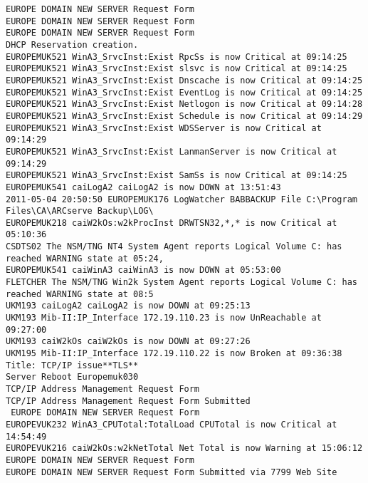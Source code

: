 \begin{lstlisting}
EUROPE DOMAIN NEW SERVER Request Form
EUROPE DOMAIN NEW SERVER Request Form
EUROPE DOMAIN NEW SERVER Request Form
DHCP Reservation creation.
EUROPEMUK521 WinA3_SrvcInst:Exist RpcSs is now Critical at 09:14:25
EUROPEMUK521 WinA3_SrvcInst:Exist slsvc is now Critical at 09:14:25
EUROPEMUK521 WinA3_SrvcInst:Exist Dnscache is now Critical at 09:14:25
EUROPEMUK521 WinA3_SrvcInst:Exist EventLog is now Critical at 09:14:25
EUROPEMUK521 WinA3_SrvcInst:Exist Netlogon is now Critical at 09:14:28
EUROPEMUK521 WinA3_SrvcInst:Exist Schedule is now Critical at 09:14:29
EUROPEMUK521 WinA3_SrvcInst:Exist WDSServer is now Critical at 09:14:29
EUROPEMUK521 WinA3_SrvcInst:Exist LanmanServer is now Critical at 09:14:29
EUROPEMUK521 WinA3_SrvcInst:Exist SamSs is now Critical at 09:14:25
EUROPEMUK541 caiLogA2 caiLogA2 is now DOWN at 13:51:43
2011-05-04 20:50:50 EUROPEMUK176 LogWatcher BABBACKUP File C:\Program Files\CA\ARCserve Backup\LOG\
EUROPEMUK218 caiW2kOs:w2kProcInst DRWTSN32,*,* is now Critical at 05:10:36
CSDTS02 The NSM/TNG NT4 System Agent reports Logical Volume C: has reached WARNING state at 05:24,
EUROPEMUK541 caiWinA3 caiWinA3 is now DOWN at 05:53:00
FLETCHER The NSM/TNG Win2k System Agent reports Logical Volume C: has reached WARNING state at 08:5
UKM193 caiLogA2 caiLogA2 is now DOWN at 09:25:13
UKM193 Mib-II:IP_Interface 172.19.110.23 is now UnReachable at 09:27:00
UKM193 caiW2kOs caiW2kOs is now DOWN at 09:27:26
UKM195 Mib-II:IP_Interface 172.19.110.22 is now Broken at 09:36:38
Title: TCP/IP issue**TLS**
Server Reboot Europemuk030
TCP/IP Address Management Request Form
TCP/IP Address Management Request Form Submitted
 EUROPE DOMAIN NEW SERVER Request Form
EUROPEVUK232 WinA3_CPUTotal:TotalLoad CPUTotal is now Critical at 14:54:49
EUROPEVUK216 caiW2kOs:w2kNetTotal Net Total is now Warning at 15:06:12
EUROPE DOMAIN NEW SERVER Request Form
EUROPE DOMAIN NEW SERVER Request Form Submitted via 7799 Web Site
\end{lstlisting}
